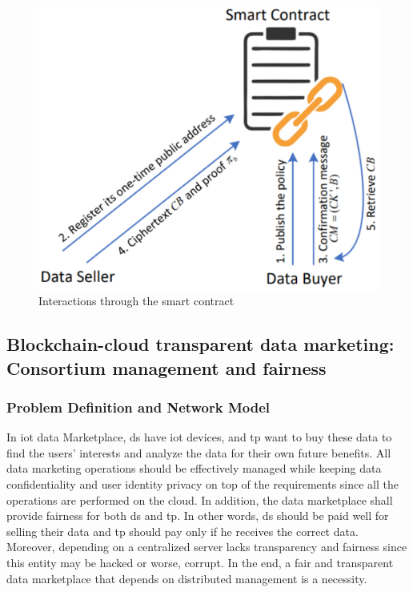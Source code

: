 \begin{figure}
\centering
  \includegraphics[width=0.8\linewidth]{imgs/23-interactions.eps}
  \caption{Interactions through the smart contract~\cite{xue2023blockchain}}
  \label{fig:23-interactions-through-smart-contract}
\end{figure}

\subsection{Blockchain-cloud transparent data marketing: Consortium management and fairness~\cite{liu2022blockchain}}
\label{sec:blockchain-cloud-trasparent-data-marketing-consortium-management}

\subsubsection{Problem Definition and Network Model}
In \ac{iot} data Marketplace, \ac{ds} have \ac{iot} devices, and \ac{tp} want to buy these data to find the users’ interests and analyze the data for their own future benefits.
All data marketing operations should be effectively managed while keeping data confidentiality and user identity privacy on top of the requirements since all the operations are performed on the cloud.
In addition, the data marketplace shall provide fairness for both \ac{ds} and \ac{tp}.
In other words, \ac{ds} should be paid well for selling their data and \ac{tp} should pay only if he receives the correct data.
Moreover, depending on a centralized server lacks transparency and fairness since this entity may be hacked or worse, corrupt.
In the end, a fair and transparent data marketplace that depends on distributed management is a necessity.

